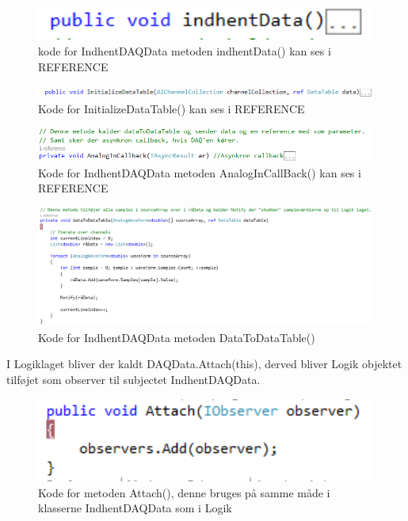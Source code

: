 \begin{figure}[H]
	\centering
	\includegraphics[width=1.0\textwidth]{FigurerProgram/indhentDataDaq}
	\caption{kode for IndhentDAQData metoden indhentData() kan ses i REFERENCE}
\end{figure}

\begin{figure}[H]
	\centering
	\includegraphics[width=1.0\textwidth]{FigurerProgram/InitiDaq}
	\caption{Kode for InitializeDataTable() kan ses i REFERENCE}
\end{figure}

\begin{figure}[H]
	\centering
	\includegraphics[width=1.0\textwidth]{FigurerProgram/CallBackDaq}
	\caption{Kode for IndhentDAQData metoden AnalogInCallBack() kan ses i REFERENCE}
\end{figure}

\begin{figure}[H]
	\centering
	\includegraphics[width=1.0\textwidth]{FigurerProgram/dtdDaq}
	\caption{Kode for IndhentDAQData metoden DataToDataTable()}
\end{figure}

I Logiklaget bliver der kaldt DAQData.Attach(this), derved bliver Logik objektet tilføjet som observer til subjectet IndhentDAQData.

\begin{figure}[H]
	\centering
	\includegraphics[width=1.0\textwidth]{FigurerProgram/AttachDaq}
	\caption{Kode for metoden Attach(), denne bruges på samme måde i klasserne IndhentDAQData som i Logik}
\end{figure}

